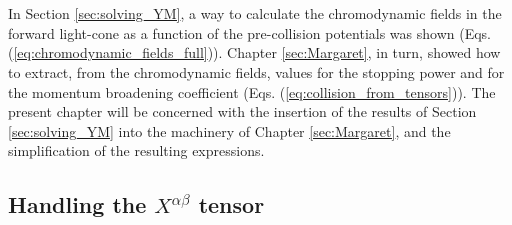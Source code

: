 \chapter{}
\label{ch:merge}

In Section \ref{sec:solving_YM}, a way to calculate the chromodynamic fields in the forward light-cone as a function of the pre-collision potentials was shown (Eqs. (\ref{eq:chromodynamic_fields_full})). Chapter \ref{sec:Margaret}, in turn, showed how to extract, from the chromodynamic fields, values for the stopping power and for the momentum broadening coefficient (Eqs. (\ref{eq:collision_from_tensors})).
The present chapter will be concerned with the insertion of the results of Section \ref{sec:solving_YM} into the machinery of Chapter \ref{sec:Margaret}, and the simplification of the resulting expressions.

\section{Handling the $X^{\alpha \beta}$ tensor}



